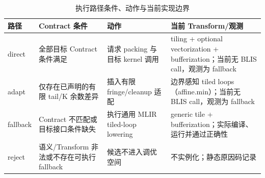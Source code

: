 \begin{table}[htbp]
  \centering
  \caption{执行路径条件、动作与当前实现边界}
  \label{tab:chapter4-paths}
  \begin{tabular}{p{}p{}p{}p{}}
    \toprule
    路径 & Contract 条件 & 动作 & 当前 Transform/观测 \\
    \midrule
    direct & 全部目标 Contract 条件满足 & 请求 packing 与目标 kernel 调用 & tiling + optional vectorization + bufferization；当前无 BLIS call，观测为 fallback \\
    adapt & 仅存在已声明的有限 tail/K 余数差异 & 插入有限 fringe/cleanup 适配 & 边界感知 tiled loops（affine.min）；当前无 BLIS call，观测为 fallback \\
    fallback & Contract 不匹配或目标接口条件缺失 & 执行通用 MLIR tiled-loop lowering & generic tile + bufferization；实际编译、运行并通过正确性 \\
    reject & 语义/Transform 非法或不存在可执行 fallback & 候选不进入调优空间 & 不实例化；静态原因码记录 \\
    \bottomrule
  \end{tabular}
\end{table}
